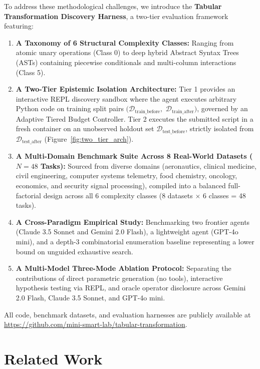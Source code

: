 \documentclass[sigconf]{acmart}
\begin{document}
To address these methodological challenges, we introduce the \textbf{Tabular Transformation Discovery Harness}, a two-tier evaluation framework featuring:
\begin{enumerate}
    \item \textbf{A Taxonomy of 6 Structural Complexity Classes:} Ranging from atomic unary operations (Class 0) to deep hybrid Abstract Syntax Trees (ASTs) containing piecewise conditionals and multi-column interactions (Class 5).
    \item \textbf{A Two-Tier Epistemic Isolation Architecture:} Tier 1 provides an interactive REPL discovery sandbox where the agent executes arbitrary Python code on training split pairs $(\mathcal{D}_{\text{train\_before}},$ $\mathcal{D}_{\text{train\_after}})$, governed by an Adaptive Tiered Budget Controller. Tier 2 executes the submitted script in a fresh container on an unobserved holdout set $\mathcal{D}_{\text{test\_before}}$, strictly isolated from $\mathcal{D}_{\text{test\_after}}$ (Figure~\ref{fig:two_tier_arch}).
    \item \textbf{A Multi-Domain Benchmark Suite Across 8 Real-World Datasets ($N=48$ Tasks):} Sourced from diverse domains (aeronautics, clinical medicine, civil engineering, computer systems telemetry, food chemistry, oncology, economics, and security signal processing), compiled into a balanced full-factorial design across all 6 complexity classes (8 datasets $\times$ 6 classes = 48 tasks).
    \item \textbf{A Cross-Paradigm Empirical Study:} Benchmarking two frontier agents (Claude 3.5 Sonnet and Gemini 2.0 Flash), a lightweight agent (GPT-4o mini), and a depth-3 combinatorial enumeration baseline representing a lower bound on unguided exhaustive search.
    \item \textbf{A Multi-Model Three-Mode Ablation Protocol:} Separating the contributions of direct parametric generation (no tools), interactive hypothesis testing via REPL, and oracle operator disclosure across Gemini 2.0 Flash, Claude 3.5 Sonnet, and GPT-4o mini.
\end{enumerate}

All code, benchmark datasets, and evaluation harnesses are publicly available at \url{https://github.com/mini-smart-lab/tabular-transformation}.

\section{Related Work}
\end{document}
